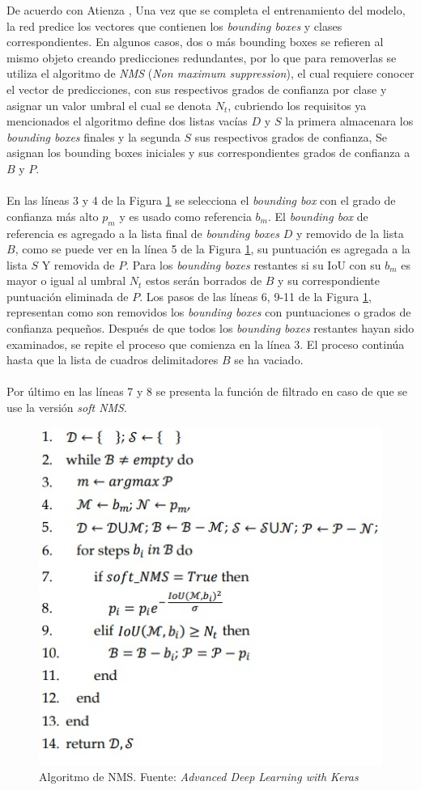 De acuerdo con Atienza \cite{Atienza2018}, Una vez que se completa el entrenamiento del modelo, la red predice los vectores que contienen los \textit{bounding boxes} y clases correspondientes. En algunos casos, dos o más bounding boxes se refieren al mismo objeto creando predicciones redundantes, por lo que para removerlas se utiliza el algoritmo de \textit{NMS} (\textit{Non maximum suppression}), el cual requiere conocer el vector de predicciones, con sus respectivos grados de confianza por clase y asignar un valor umbral el cual se denota $N_{t}$, cubriendo los requisitos ya mencionados el algoritmo define dos listas vacías $D$ y $S$ la primera almacenara los \textit{bounding boxes} finales y la segunda $S$ sus respectivos grados de confianza, Se asignan los bounding boxes iniciales y sus correspondientes grados de confianza a $B$ y $P$.
\\
\\
En las líneas 3 y 4 de la Figura \ref{NMS_algo} se selecciona el \textit{bounding box} con el grado de confianza más alto $p_{m}$ y es usado como referencia $b_{m}$. El \textit{bounding box} de referencia es agregado a la lista final de \textit{bounding boxes} $D$ y removido de la lista $B$, como se puede ver en la línea 5 de la Figura \ref{NMS_algo}, su puntuación es agregada a la lista $S$ Y removida de $P$. Para los \textit{bounding boxes} restantes si su IoU con su $b_{m}$ es mayor o igual al umbral $N_{t}$ estos serán borrados de $B$ y su correspondiente puntuación eliminada de $P$. Los pasos de las líneas 6, 9-11 de la Figura \ref{NMS_algo}, representan como son removidos los \textit{bounding boxes} con puntuaciones o grados de confianza pequeños. Después de que todos los \textit{bounding boxes} restantes hayan sido
examinados, se repite el proceso que comienza en la línea 3. El proceso continúa hasta
que la lista de cuadros delimitadores $B$ se ha vaciado. 
\\
\\
Por último en las líneas 7 y 8 se presenta la función de filtrado en caso de que se use la versión \textit{soft NMS}.
\begin{figure}[H]
    \centering
    \includegraphics{Recursos/nms_algo.jpg}
    \caption[Algoritmo de NMS]{Algoritmo de NMS. {\footnotesize Fuente: \textit{Advanced Deep Learning with Keras} \cite[p.~376]{Atienza2018}}}
    \label{NMS_algo}
\end{figure}